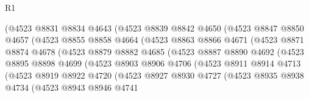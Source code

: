 \begin{lexlean}{R1}
\begin{coremodule}
                      (@4523
                        @8831
                        @8834
                        @4643
                        (@4523
                          @8839
                          @8842
                          @4650
                          (@4523
                            @8847
                            @8850
                            @4657
                            (@4523
                              @8855
                              @8858
                              @4664
                              (@4523
                                @8863
                                @8866
                                @4671
                                (@4523
                                  @8871
                                  @8874
                                  @4678
                                  (@4523
                                    @8879
                                    @8882
                                    @4685
                                    (@4523
                                      @8887
                                      @8890
                                      @4692
                                      (@4523
                                        @8895
                                        @8898
                                        @4699
                                        (@4523
                                          @8903
                                          @8906
                                          @4706
                                          (@4523
                                            @8911
                                            @8914
                                            @4713
                                            (@4523
                                              @8919
                                              @8922
                                              @4720
                                              (@4523
                                                @8927
                                                @8930
                                                @4727
                                                (@4523
                                                  @8935
                                                  @8938
                                                  @4734
                                                  (@4523
                                                    @8943
                                                    @8946
                                                    @4741

\end{coremodule}
\end{lexlean}
